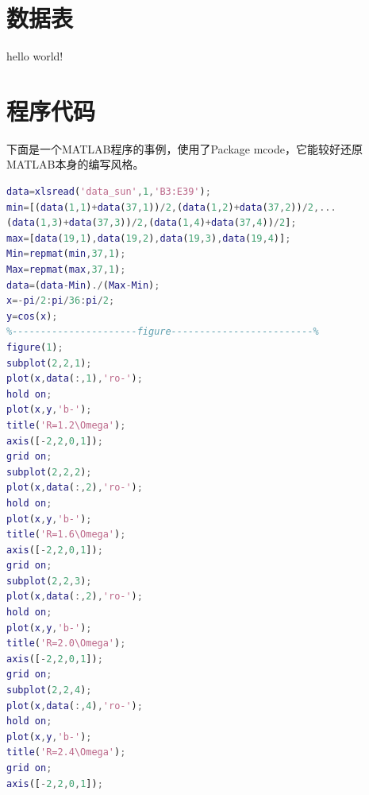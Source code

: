 \documentclass[a4paper,12pt]{report}
\begin{document}

\lstset{breaklines}                %
\lstset{extendedchars=false}
\lstset{language=Matlab}
\renewcommand{\thechapter}{附录\Alph{chapter}.} 
\appendix
\begin{appendix}
	
	
\chapter{数据表}
\songti
\begin{spacing}{1.5}
	hello world!
\end{spacing}


\chapter{程序代码}
\songti
\begin{spacing}{1.5}
下面是一个MATLAB程序的事例，使用了Package mcode，它能较好还原MATLAB本身的编写风格。
\begin{lstlisting}[language={matlab}]
%The program normalizes the measurement data and compares it to the standard cosine function
data=xlsread('data_sun',1,'B3:E39');
min=[(data(1,1)+data(37,1))/2,(data(1,2)+data(37,2))/2,...
(data(1,3)+data(37,3))/2,(data(1,4)+data(37,4))/2];
max=[data(19,1),data(19,2),data(19,3),data(19,4)];
Min=repmat(min,37,1);
Max=repmat(max,37,1);
data=(data-Min)./(Max-Min);
x=-pi/2:pi/36:pi/2;
y=cos(x);
%----------------------figure-------------------------%
figure(1);
subplot(2,2,1);
plot(x,data(:,1),'ro-');
hold on;
plot(x,y,'b-');
title('R=1.2\Omega');
axis([-2,2,0,1]);
grid on;
subplot(2,2,2);
plot(x,data(:,2),'ro-');
hold on;
plot(x,y,'b-');
title('R=1.6\Omega');
axis([-2,2,0,1]);
grid on;
subplot(2,2,3);
plot(x,data(:,2),'ro-');
hold on;
plot(x,y,'b-');
title('R=2.0\Omega');
axis([-2,2,0,1]);
grid on;
subplot(2,2,4);
plot(x,data(:,4),'ro-');
hold on;
plot(x,y,'b-');
title('R=2.4\Omega');
grid on;
axis([-2,2,0,1]);
\end{lstlisting}
\end{spacing}
\end{appendix}
\end{document}
